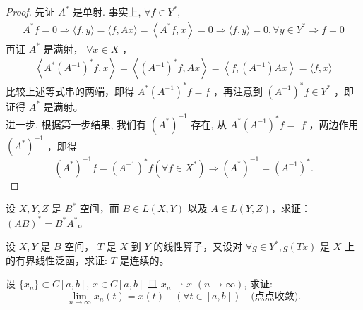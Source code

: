 \documentclass[lang=cn,newtx,10pt,scheme=chinese,thmcnt=chapter]{elegantbook}
\begin{document}
\begin{proof}
先证 $A^*$ 是单射. 事实上, $\forall f \in {Y} ^*$,
\begin{equation*}
\begin{array}{cc}
A^*f=0\Rightarrow\langle f, y\rangle=\langle f, A x\rangle=\left\langle A^* f, x\right\rangle=0 \Longrightarrow\langle f, y\rangle=0, \forall y \in {Y}^*\Rightarrow f=0
\end{array}
\end{equation*}
再证 $A^*$ 是满射， $\forall x \in {X}$ ，
\begin{equation*}
\begin{array}{cc}
\left\langle A^*\left(A^{-1}\right)^* f, x\right\rangle =\left\langle\left(A^{-1}\right)^* f, A x\right\rangle=\left\langle f,\left(A^{-1}\right) A x\right\rangle= \langle f, x\rangle 

\end{array}
\end{equation*}
比较上述等式串的两端，即得 $A^*\left(A^{-1}\right)^* f=f$ ，再注意到 $\left(A^{-1}\right)^* f \in {Y} ^*$ ，即证得 $A^*$ 是满射。\\
进一步, 根据第一步结果, 我们有 $\left(A^*\right)^{-1}$ 存在, 从 $A^*\left(A^{-1}\right)^* f=$ $f$ ，两边作用 $\left(A^*\right)^{-1}$ ，即得
\begin{equation*}
\left(A^*\right)^{-1} f=\left(A^{-1}\right)^* f\left(\forall f \in X ^*\right) \Rightarrow\left(A^*\right)^{-1}=\left(A^{-1}\right)^* .
\end{equation*}
\end{proof}
\begin{problem}
  设 ${X}, {Y}, {Z}$ 是 ${B}^*$ 空间，而 $B \in {L}({X}, {Y})$ 以及 $A \in {L}({Y}, {Z})$，求证：$(A B)^* = B^* A^*$。
\end{problem}

\begin{problem}
  设 ${X}, {Y}$ 是 ${B}$ 空间， $T$ 是 ${X}$ 到 ${Y}$ 的线性算子，又设对 $\forall g \in {Y}^*, g(T x)$ 是 ${X}$ 上的有界线性泛函，求证: $T$ 是连续的。
\end{problem}

\begin{problem}
  设 $\{x_n\} \subset C[a, b]$, $x \in C[a, b]$ 且 $x_n \rightharpoonup x$ $(n \to \infty)$, 求证:
  \[
  \lim_{n \to \infty} x_n(t) = x(t) \quad (\forall t \in [a, b]) \quad \text{(点点收敛)}.
  \]
\end{problem}
\end{document}
